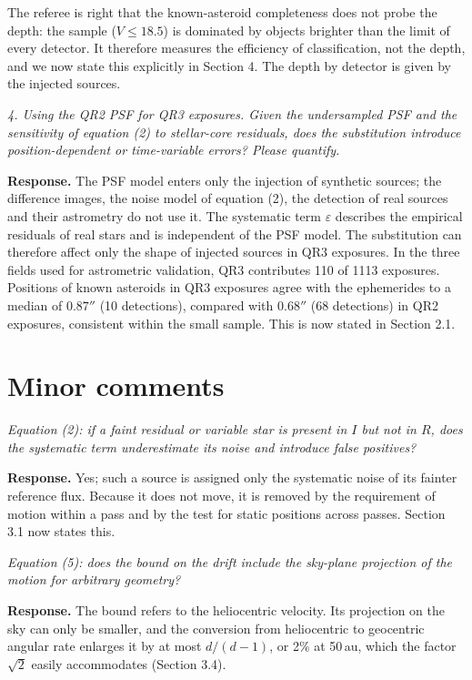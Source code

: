 \documentclass[11pt]{article}
\newenvironment{referee}{\par\color{black!60}\itshape}{\par}
\newcommand{\resp}{\par\noindent\textbf{Response.} }
\begin{document}
The referee is right that the known-asteroid completeness does not probe the depth: the sample ($V \le 18.5$) is dominated by objects brighter than the limit of every detector. It therefore measures the efficiency of classification, not the depth, and we now state this explicitly in Section 4. The depth by detector is given by the injected sources.

\begin{referee}
4. Using the QR2 PSF for QR3 exposures. Given the undersampled PSF and the sensitivity of equation (2) to stellar-core residuals, does the substitution introduce position-dependent or time-variable errors? Please quantify.
\end{referee}
\resp The PSF model enters only the injection of synthetic sources; the difference images, the noise model of equation (2), the detection of real sources and their astrometry do not use it. The systematic term $\varepsilon$ describes the empirical residuals of real stars and is independent of the PSF model. The substitution can therefore affect only the shape of injected sources in QR3 exposures. In the three fields used for astrometric validation, QR3 contributes 110 of 1113 exposures. Positions of known asteroids in QR3 exposures agree with the ephemerides to a median of $0.87''$ (10 detections), compared with $0.68''$ (68 detections) in QR2 exposures, consistent within the small sample. This is now stated in Section 2.1.

\section*{Minor comments}

\begin{referee}
Equation (2): if a faint residual or variable star is present in $I$ but not in $R$, does the systematic term underestimate its noise and introduce false positives?
\end{referee}
\resp Yes; such a source is assigned only the systematic noise of its fainter reference flux. Because it does not move, it is removed by the requirement of motion within a pass and by the test for static positions across passes. Section 3.1 now states this.

\begin{referee}
Equation (5): does the bound on the drift include the sky-plane projection of the motion for arbitrary geometry?
\end{referee}
\resp The bound refers to the heliocentric velocity. Its projection on the sky can only be smaller, and the conversion from heliocentric to geocentric angular rate enlarges it by at most $d/(d-1)$, or 2\% at 50\,au, which the factor $\sqrt{2}$ easily accommodates (Section 3.4).
\end{document}

